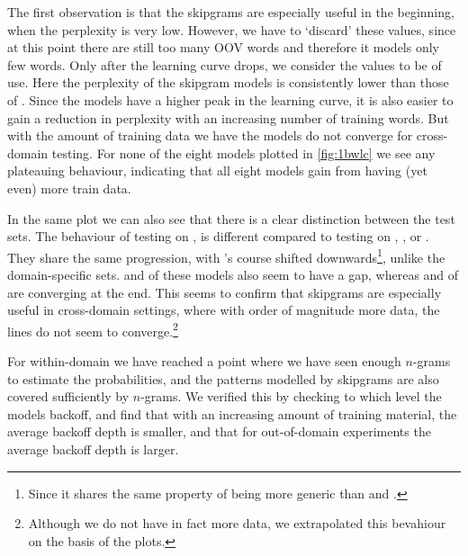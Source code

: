 The first observation is that the skipgrams are especially useful in the beginning, when the perplexity is very low. However, we have to `discard' these values, since at this point there are still too many OOV words and therefore it models only few words. Only after the learning curve drops, we consider the values to be of use. Here the perplexity of the skipgram models is consistently lower than those of \BON. Since the \BON models have a higher peak in the learning curve, it is also easier to gain a reduction in perplexity with an increasing number of training words. But with the amount of training data we have the models do not converge for cross-domain testing. For none of the eight models plotted in \cref{fig:1bwlc} we see any plateauing behaviour, indicating that all eight models gain from having (yet even) more train data.

In the same plot we can also see that there is a clear distinction between the test sets. The behaviour of testing on \obw, is different compared to testing on \jrc, \emea, or \wp. They share the same progression, with \wp's course shifted downwards\footnote{Since it shares the same property of being more generic than \jrc and \emea.}, unlike the domain-specific sets. \BON and \BOF of these models also seem to have a gap, whereas \BON and \BOL of \obw are converging at the end. This seems to confirm that skipgrams are especially useful in cross-domain settings, where with order of magnitude more data, the lines do not seem to converge.\footnote{Although we do not have in fact more data, we extrapolated this bevahiour on the basis of the plots.}

For within-domain we have reached a point where we have seen enough $n$-grams to estimate the probabilities, and the patterns modelled by skipgrams are also covered sufficiently by $n$-grams. We verified this by checking to which level the models backoff, and find that with an increasing amount of training material, the average backoff depth is smaller, and that for out-of-domain experiments the average backoff depth is larger.

